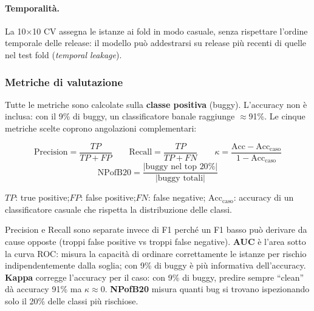 \paragraph{Temporalità.}
La 10$\times$10 CV assegna le istanze ai fold in modo casuale, senza rispettare l'ordine
temporale delle release: il modello può addestrarsi su release più recenti di quelle nel
test fold (\textit{temporal leakage}).

\subsubsection{Metriche di valutazione}

Tutte le metriche sono calcolate sulla \textbf{classe positiva} (buggy). L'accuracy
non è inclusa: con il 9\% di buggy, un classificatore banale raggiunge $\approx$91\%.
Le cinque metriche scelte coprono angolazioni complementari:

\[
\text{Precision} = \frac{TP}{TP+FP} \qquad \text{Recall} = \frac{TP}{TP+FN} \qquad
\kappa = \frac{\text{Acc} - \text{Acc}_{\text{caso}}}{1 - \text{Acc}_{\text{caso}}}
\]
\[
\text{NPofB20} = \frac{|\text{buggy nel top }20\%|}{|\text{buggy totali}|}
\]

\noindent\small
$TP$: true positive;\enspace $FP$: false positive;\enspace $FN$: false negative;\enspace
$\text{Acc}_{\text{caso}}$: accuracy di un classificatore casuale che rispetta la distribuzione delle classi.
\normalsize

\medskip
Precision e Recall sono separate invece di F1 perché un F1 basso può derivare da cause
opposte (troppi false positive vs troppi false negative). \textbf{AUC} è l'area sotto la
curva ROC: misura la capacità di ordinare correttamente le istanze per rischio
indipendentemente dalla soglia; con 9\% di buggy è più informativa dell'accuracy.
\textbf{Kappa} corregge l'accuracy per il caso: con 9\% di buggy, predire sempre
``clean'' dà accuracy 91\% ma $\kappa \approx 0$. \textbf{NPofB20} misura quanti bug
si trovano ispezionando solo il 20\% delle classi più rischiose.

